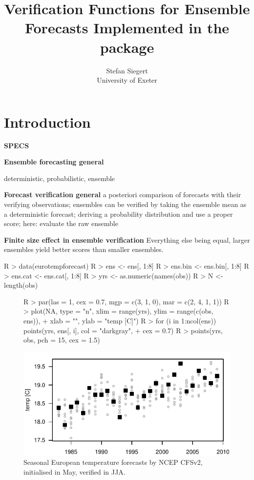 \documentclass[article]{jss}
\author{Stefan Siegert\\University of Exeter}
\title{Verification Functions for Ensemble Forecasts Implemented in the \proglang{R} package \pkg{SpecsVerification}}
\begin{document}



\section{Introduction}

{\bf SPECS}

{\bf Ensemble forecasting general}

deterministic, probabilistic, ensemble


{\bf Forecast verification general}
a posteriori comparison of forecasts with their verifying observations;
ensembles can be verified by taking the ensemble mean as a deterministic forecast; deriving a probability distribution and use a proper score; here: evaluate the raw ensemble

{\bf Finite size effect in ensemble verification}
Everything else being equal, larger ensembles yield better scores than smaller ensembles.


\begin{Schunk}
\begin{Sinput}
R > data(eurotempforecast)
R > ens <- ens[, 1:8]
R > ens.bin <- ens.bin[, 1:8]
R > ens.cat <- ens.cat[, 1:8]
R > yrs <- as.numeric(names(obs))
R > N   <- length(obs)
\end{Sinput}
\end{Schunk}


\begin{figure}
\begin{center}
%
\begin{Schunk}
\begin{Sinput}
R > par(las = 1, cex = 0.7, mgp = c(3, 1, 0), mar = c(2, 4, 1, 1))
R > plot(NA, type = "n", xlim = range(yrs), ylim = range(c(obs, ens)), 
+     xlab = "", ylab = "temp [C]")
R > for (i in 1:ncol(ens)) points(yrs, ens[, i], col = "darkgray", 
+     cex = 0.7)
R > points(yrs, obs, pch = 15, cex = 1.5)
\end{Sinput}
\end{Schunk}
\includegraphics{fig-gfs-plot}
%
\end{center}
\caption{Seasonal European temperature forecasts by NCEP CFSv2, initialised in May, verified in JJA.}
\label{gfs-plot}
\end{figure}
\end{document}
